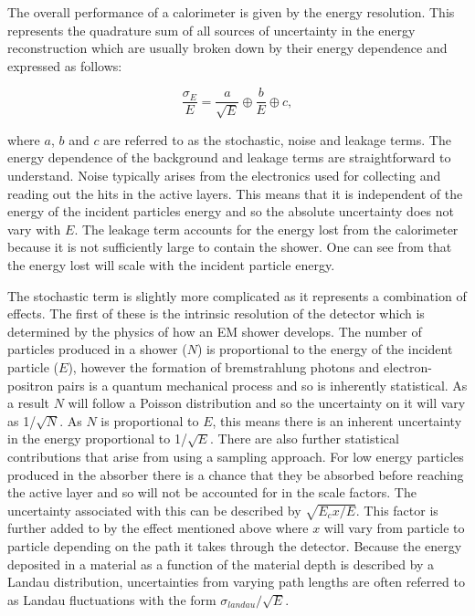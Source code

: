 The overall performance of a calorimeter is given by the energy resolution. This represents the quadrature sum of all sources of uncertainty in the energy reconstruction which are usually broken down by their energy dependence and expressed as follows:

\begin{equation}
  \frac{\sigma_E}{E}=\frac{a}{\sqrt{E}} \oplus \frac{b}{E} \oplus c,
\end{equation}

where $a$, $b$ and $c$ are referred to as the stochastic, noise and leakage terms. The energy dependence of the background and leakage terms are straightforward to understand. Noise typically arises from the electronics used for collecting and reading out the hits in the active layers. This means that it is independent of the energy of the incident particles energy and so the absolute uncertainty does not vary with $E$. The leakage term accounts for the energy lost from the calorimeter because it is not sufficiently large to contain the shower. One can see from  that the energy lost will scale with the incident particle energy.

The stochastic term is slightly more complicated as it represents a combination of effects. The first of these is the intrinsic resolution of the detector which is determined by the physics of how an \ac{EM} shower develops. The number of particles produced in a shower ($N$)  is proportional to the energy of the incident particle ($E$), however the formation of bremstrahlung photons and electron-positron pairs is a quantum mechanical process and so is inherently statistical. As a result $N$ will follow a Poisson distribution and so the uncertainty on it will vary as 1/$\sqrt{N}$. As $N$ is proportional to $E$, this means there is an inherent uncertainty in the energy proportional to 1/$\sqrt{E}$. There are also further statistical contributions that arise from using a sampling approach. For low energy particles produced in the absorber there is a chance that they be absorbed before reaching the active layer and so will not be accounted for in the scale factors. The uncertainty associated with this can be described by $\sqrt{E_{c}x/E}$. This factor is further added to by the effect mentioned above where $x$ will vary from particle to particle depending on the path it takes through the detector. Because the energy deposited in a material as a function of the material depth is described by a Landau distribution, uncertainties from varying path lengths are often referred to as Landau fluctuations with the form $\sigma_{landau}/\sqrt{E}$.

